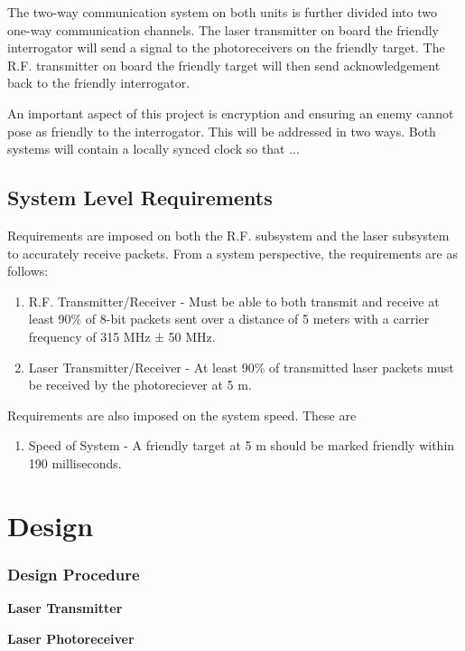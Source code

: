 \documentclass[letterpaper,10pt]{article}
\begin{document}
\begin{spacing}{1.15}
The two-way communication system on both units is further divided into two one-way communication channels. The laser transmitter on board the friendly interrogator will send a signal to the photoreceivers on the friendly target. The R.F. transmitter on board the friendly target will then send acknowledgement back to the friendly interrogator. 

An important aspect of this project is encryption and ensuring an enemy cannot pose as friendly to the interrogator. This will be addressed in two ways. Both systems will contain a locally synced clock so that ...


\subsection{System Level Requirements}
Requirements are imposed on both the R.F. subsystem and the laser subsystem to accurately receive packets. From a system perspective, the requirements are as follows:
\begin{enumerate}
	\item R.F. Transmitter/Receiver - Must be able to both transmit and receive at least 90\% of 8-bit packets sent over a distance of 5 meters with a carrier frequency of 315 MHz ± 50 MHz.
	\item Laser Transmitter/Receiver - At least 90\% of transmitted laser packets must be received by the photoreciever at 5 m.
\end{enumerate}

Requirements are also imposed on the system speed. These are 
\begin{enumerate}
	\item Speed of System - A friendly target at 5 m should be marked friendly within 190 milliseconds.
\end{enumerate}


\clearpage


\section{Design}



\subsubsection{Design Procedure} 
\hspace{5mm}\textbf{Laser Transmitter} \label{section:laser-transmitter-design}

\hspace{5mm}\textbf{Laser Photoreceiver} \label{section:laser-photoreceiver-design}


\end{spacing}
\end{document}
